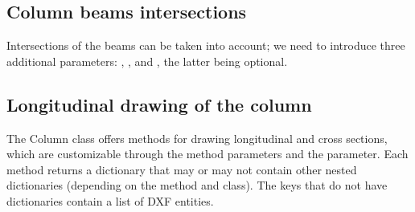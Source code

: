 \documentclass[a4paper,10pt,english]{sphinxmanual}
\begin{document}
\subsection{Column beams intersections}
\label{\detokenize{usage:column-beams-intersections}}
\sphinxAtStartPar
Intersections of the beams can be taken into account; we need to introduce three additional parameters:
, , and , the latter being optional.

\begin{sphinxVerbatim}[commandchars=\\\{\}]
  
                 
                 
                 
                 
                \PYG{p}{[}   \PYG{p}{]}
                \PYG{p}{[} \PYG{p}{]}
                \PYG{p}{[} \PYG{p}{]}
\end{sphinxVerbatim}


\subsection{Longitudinal drawing of the column}
\label{\detokenize{usage:longitudinal-drawing-of-the-column}}
\sphinxAtStartPar
The Column class offers methods for drawing longitudinal and cross sections, which are customizable through the method
parameters and the  parameter.
Each method returns a dictionary that may or may not contain other nested dictionaries (depending on the method and
class). The keys that do not have dictionaries contain a list of DXF entities.
\end{document}
